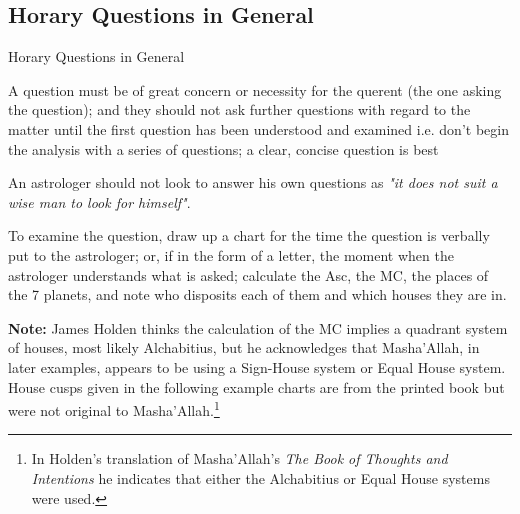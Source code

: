 \subsection{Horary Questions in General}
\begin{frame}[t]{Horary Questions in General}

A question must be of great concern or necessity for the querent (the one asking the question); and they should not ask further questions with regard to the matter until the first question has been understood and examined i.e. don't begin the analysis with a series of questions; a clear, concise question is best

An astrologer should not look to answer his own questions as \textsl{"it does not suit a wise man to look for himself"}. 

To examine the question, draw up a chart for the time the question is verbally put to the astrologer; or, if in the form of a letter, the moment when the astrologer understands what is asked; calculate the Asc, the MC, the places of the 7 planets, and note who disposits each of them and which houses they are in.
\vspace{0.5cm}
\begin{mdframed}[backgroundcolor=gray!5, rightmargin=2em, leftmargin=2em]
\small
\textbf{Note:} James Holden thinks the calculation of the MC implies a quadrant system of houses, most likely Alchabitius, but he acknowledges that Masha'Allah, in later examples, appears to be using a Sign-House system or Equal House system. House cusps given in the following example charts are from the printed book but were not original to Masha'Allah.\footnote{In Holden's translation of Masha'Allah's \textsl{The Book of Thoughts and Intentions} he indicates that either the Alchabitius or Equal House systems were used.}
\end{mdframed}

\end{frame}